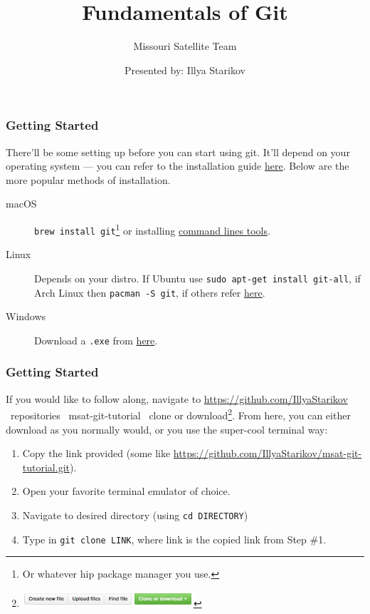 \documentclass{beamer}
\title{Fundamentals of Git}
\subtitle{Missouri Satellite Team}
\author{Presented by: Illya Starikov}
\date{ }
\newcommand{\shellcmd}[1]{\texttt{\colorbox{gray!30}{#1}}}
\begin{document}
\begin{frame}
    \maketitle
\end{frame}

\begin{frame}
    \frametitle{Getting Started}

    There'll be some setting up before you can start using git. It'll depend on your operating system --- you can refer to the installation guide
    \href{https://git-scm.com/book/en/v2/Getting-Started-Installing-Git}{here}.
    Below are the more popular methods of installation.

    \begin{description}
        \item[macOS] \shellcmd{brew install git}\footnote{Or whatever hip package manager you use.} or installing \href{http://osxdaily.com/2014/02/12/install-command-line-tools-mac-os-x/}{command lines tools}.
        \item[Linux] Depends on your distro. If Ubuntu use \shellcmd{sudo apt-get install git-all}, if Arch Linux then \shellcmd{pacman -S git}, if others refer \href{https://git-scm.com/download/linux}{here}.
        \item[Windows] Download a \texttt{.exe} from \href{https://git-scm.com/download/win}{here}.
    \end{description}

\end{frame}

\begin{frame}
    \frametitle{Getting Started}
    If you would like to follow along, navigate to \url{https://github.com/IllyaStarikov} \textrightarrow \ repositories \textrightarrow \ msat-git-tutorial \textrightarrow \ clone or download\footnote{\includegraphics[width=0.5\textwidth]{github-clone}}. From here, you can either download as you normally would, or you use the super-cool terminal way:

    \begin{enumerate}
        \item Copy the link provided (some like \url{https://github.com/IllyaStarikov/msat-git-tutorial.git}).
        \item Open your favorite terminal emulator of choice.
        \item Navigate to desired directory (using \shellcmd{cd DIRECTORY})
        \item Type in \shellcmd{git clone LINK}, where link is the copied link from Step \#1.
    \end{enumerate}


\end{frame}
\end{document}
